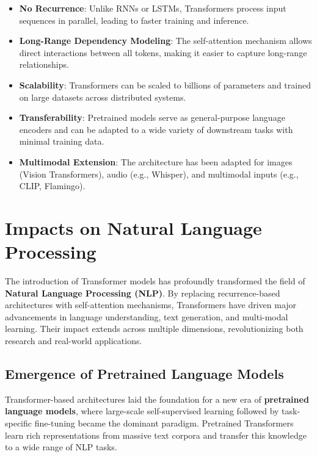 \begin{itemize}
    \item \textbf{No Recurrence}: Unlike RNNs or LSTMs, Transformers process input sequences in parallel, leading to faster training and inference.
    
    \item \textbf{Long-Range Dependency Modeling}: The self-attention mechanism allows direct interactions between all tokens, making it easier to capture long-range relationships.

    \item \textbf{Scalability}: Transformers can be scaled to billions of parameters and trained on large datasets across distributed systems.

    \item \textbf{Transferability}: Pretrained models serve as general-purpose language encoders and can be adapted to a wide variety of downstream tasks with minimal training data.

    \item \textbf{Multimodal Extension}: The architecture has been adapted for images (Vision Transformers), audio (e.g., Whisper), and multimodal inputs (e.g., CLIP, Flamingo).
\end{itemize}

\newpage

\section{Impacts on Natural Language Processing}

The introduction of Transformer models has profoundly transformed the field of \textbf{Natural Language Processing (NLP)}. By replacing recurrence-based architectures with self-attention mechanisms, Transformers have driven major advancements in language understanding, text generation, and multi-modal learning. Their impact extends across multiple dimensions, revolutionizing both research and real-world applications.

\subsection{Emergence of Pretrained Language Models}

Transformer-based architectures laid the foundation for a new era of \textbf{pretrained language models}, where large-scale self-supervised learning followed by task-specific fine-tuning became the dominant paradigm. Pretrained Transformers learn rich representations from massive text corpora and transfer this knowledge to a wide range of NLP tasks.

